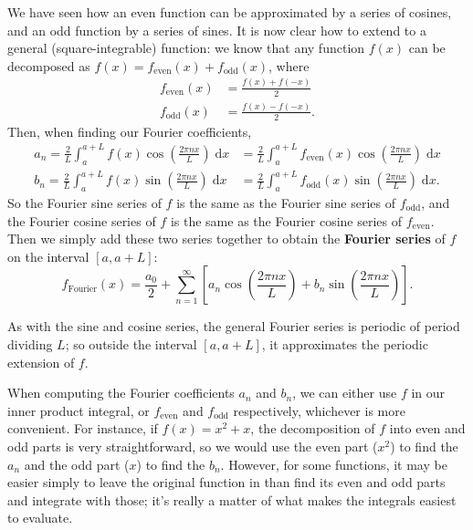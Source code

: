 \documentclass{article}
\newcommand{\diff}{\;\mathrm{d}}
\begin{document}
We have seen how an even function can be approximated by a series of cosines, and an odd function by a series of sines. It is now clear how to extend to a general (square-integrable) function: we know that any function $f(x)$ can be decomposed as $f(x)=f_\mathrm{even}(x)+f_\mathrm{odd}(x)$, where
\begin{align*}
	f_\mathrm{even}(x)&=\frac{f(x)+f(-x)}{2}\\
	f_\mathrm{odd}(x)&=\frac{f(x)-f(-x)}{2}.
\end{align*}
Then, when finding our Fourier coefficients,
\begin{align*}
	a_n=\frac{2}{L}\int_a^{a+L} f(x)\cos\left(\frac{2\pi nx}{L}\right)\diff x &= \frac{2}{L}\int_a^{a+L}f_\mathrm{even}(x)\cos\left(\frac{2\pi nx}{L}\right)\diff x\\
	b_n=\frac{2}{L}\int_a^{a+L}f(x)\sin\left(\frac{2\pi nx}{L}\right)\diff x &=\frac{2}{L}\int_a^{a+L}f_\mathrm{odd}(x)\sin\left(\frac{2\pi nx}{L}\right)\diff x.
\end{align*}
So the Fourier sine series of $f$ is the same as the Fourier sine series of $f_\mathrm{odd}$, and the Fourier cosine series of $f$ is the same as the Fourier cosine series of $f_\mathrm{even}$. Then we simply add these two series together to obtain the \textbf{Fourier series} of $f$ on the interval $[a,a+L]$:
\[f_\mathrm{Fourier}(x)=\frac{a_0}{2}+\sum_{n=1}^\infty \left[a_n\cos\left(\frac{2\pi nx}{L}\right)+b_n\sin\left(\frac{2\pi nx}{L}\right)\right].\]

As with the sine and cosine series, the general Fourier series is periodic of period dividing $L$; so outside the interval $[a,a+L]$, it approximates the periodic extension of $f$.

When computing the Fourier coefficients $a_n$ and $b_n$, we can either use $f$ in our inner product integral, or $f_\mathrm{even}$ and $f_\mathrm{odd}$ respectively, whichever is more convenient. For instance, if $f(x)=x^2+x$, the decomposition of $f$ into even and odd parts is very straightforward, so we would use the even part ($x^2$) to find the $a_n$ and the odd part ($x$) to find the $b_n$. However, for some functions, it may be easier simply to leave the original function in than find its even and odd parts and integrate with those; it's really a matter of what makes the integrals easiest to evaluate.


\clearpage
\end{document}
